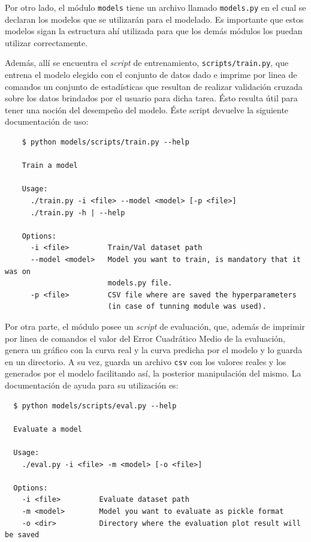 \begin{appendix}
  \par Por otro lado, el módulo \verb|models| tiene un archivo llamado
    \verb|models.py| en el cual se declaran los modelos
    que se utilizarán para el modelado. Es importante que estos modelos
    sigan la estructura ahí utilizada para que los demás módulos los
    puedan utilizar correctamente.

  \par Además, allí se encuentra el \textit{script} de entrenamiento,
    \verb|scripts/train.py|, que entrena el modelo elegido con el conjunto
    de datos dado e imprime por linea de comandos un conjunto de
    estadísticas que resultan de realizar validación cruzada sobre
    los datos brindados por el usuario para dicha tarea. Ésto resulta útil
    para tener una noción del desempeño del modelo.
    Éste script devuelve la siguiente documentación de uso:
    \begin{lstlisting}
    $ python models/scripts/train.py --help

    Train a model

    Usage:
      ./train.py -i <file> --model <model> [-p <file>]
      ./train.py -h | --help

    Options:
      -i <file>         Train/Val dataset path
      --model <model>   Model you want to train, is mandatory that it was on
                        models.py file.
      -p <file>         CSV file where are saved the hyperparameters
                        (in case of tunning module was used).
    \end{lstlisting}

  \par Por otra parte, el módulo posee un \textit{script} de evaluación,
  que, además de imprimir por linea de comandos el valor del Error Cuadrático Medio de la
  evaluación, genera un gráfico con la curva real y la curva predicha
  por el modelo y lo guarda en un directorio. A su vez, guarda un
  archivo \verb|csv| con los valores reales y los generados por el modelo
  facilitando así, la posterior manipulación del mismo.
  La documentación de ayuda para su utilización es:
  \begin{lstlisting}
  $ python models/scripts/eval.py --help

  Evaluate a model

  Usage:
    ./eval.py -i <file> -m <model> [-o <file>]

  Options:
    -i <file>         Evaluate dataset path
    -m <model>        Model you want to evaluate as pickle format
    -o <dir>          Directory where the evaluation plot result will be saved


\end{lstlisting}
\end{appendix}
